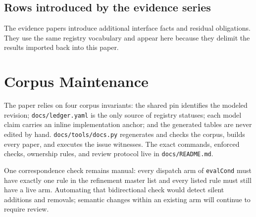 \documentclass[11pt]{article}
\begin{document}


\subsection{Rows introduced by the evidence series}

The evidence papers introduce additional interface facts and residual
obligations. They use the same registry vocabulary and appear here because
they delimit the results imported back into this paper.



\section{Corpus Maintenance}
\label{app:maintenance}

The paper relies on four corpus invariants: the shared pin identifies the
modeled revision; \texttt{docs/ledger.yaml} is the only source of registry
statuses; each model claim carries an inline implementation anchor; and the
generated tables are never edited by hand. \texttt{docs/tools/docs.py}
regenerates and checks the corpus, builds every paper, and executes the issue
witnesses. The exact commands, enforced checks, ownership rules, and review
protocol live in \texttt{docs/README.md}.

One correspondence check remains manual: every dispatch arm of
\texttt{evalCond} must have exactly one rule in the refinement master list and
every listed rule must still have a live arm. Automating that bidirectional
check would detect silent additions and removals; semantic changes within an
existing arm will continue to require review.
\end{document}

